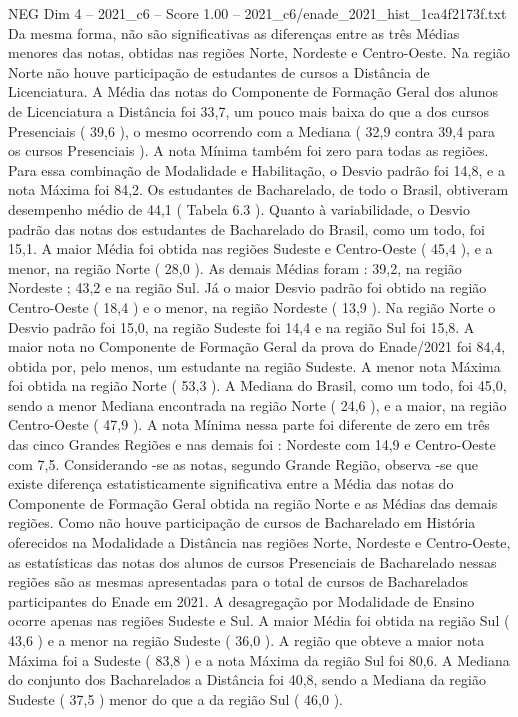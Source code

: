 \begin{textsample}{NEG Dim 4 – 2021\_c6 – Score 1.00 – 2021\_c6/enade\_2021\_hist\_1ca4f2173f.txt}
Da mesma forma, não são significativas as diferenças entre as três Médias menores das notas, obtidas nas regiões Norte, Nordeste e Centro-Oeste.
Na região Norte não houve participação de estudantes de cursos a Distância de Licenciatura.
A Média das notas do Componente de Formação Geral dos alunos de Licenciatura a Distância foi 33,7, um pouco mais baixa do que a dos cursos Presenciais ( 39,6 ), o mesmo ocorrendo com a Mediana ( 32,9 contra 39,4 para os cursos Presenciais ).
A nota Mínima também foi zero para todas as regiões.
Para essa combinação de Modalidade e Habilitação, o Desvio padrão foi 14,8, e a nota Máxima foi 84,2.
Os estudantes de Bacharelado, de todo o Brasil, obtiveram desempenho médio de 44,1 ( Tabela 6.3 ).
Quanto à variabilidade, o Desvio padrão das notas dos estudantes de Bacharelado do Brasil, como um todo, foi 15,1.
A maior Média foi obtida nas regiões Sudeste e Centro-Oeste ( 45,4 ), e a menor, na região Norte ( 28,0 ).
As demais Médias foram : 39,2, na região Nordeste ; 43,2 e na região Sul.
Já o maior Desvio padrão foi obtido na região Centro-Oeste ( 18,4 ) e o menor, na região Nordeste ( 13,9 ).
Na região Norte o Desvio padrão foi 15,0, na região Sudeste foi 14,4 e na região Sul foi 15,8.
A maior nota no Componente de Formação Geral da prova do Enade/2021 foi 84,4, obtida por, pelo menos, um estudante na região Sudeste.
A menor nota Máxima foi obtida na região Norte ( 53,3 ).
A Mediana do Brasil, como um todo, foi 45,0, sendo a menor Mediana encontrada na região Norte ( 24,6 ), e a maior, na região Centro-Oeste ( 47,9 ).
A nota Mínima nessa parte foi diferente de zero em três das cinco Grandes Regiões e nas demais foi : Nordeste com 14,9 e Centro-Oeste com 7,5.
Considerando -se as notas, segundo Grande Região, observa -se que existe diferença estatisticamente significativa entre a Média das notas do Componente de Formação Geral obtida na região Norte e as Médias das demais regiões.
Como não houve participação de cursos de Bacharelado em História oferecidos na Modalidade a Distância nas regiões Norte, Nordeste e Centro-Oeste, as estatísticas das notas dos alunos de cursos Presenciais de Bacharelado nessas regiões são as mesmas apresentadas para o total de cursos de Bacharelados participantes do Enade em 2021.
A desagregação por Modalidade de Ensino ocorre apenas nas regiões Sudeste e Sul.
A maior Média foi obtida na região Sul ( 43,6 ) e a menor na região Sudeste ( 36,0 ).
A região que obteve a maior nota Máxima foi a Sudeste ( 83,8 ) e a nota Máxima da região Sul foi 80,6.
A Mediana do conjunto dos Bacharelados a Distância foi 40,8, sendo a Mediana da região Sudeste ( 37,5 ) menor do que a da região Sul ( 46,0 ).

\end{textsample}
